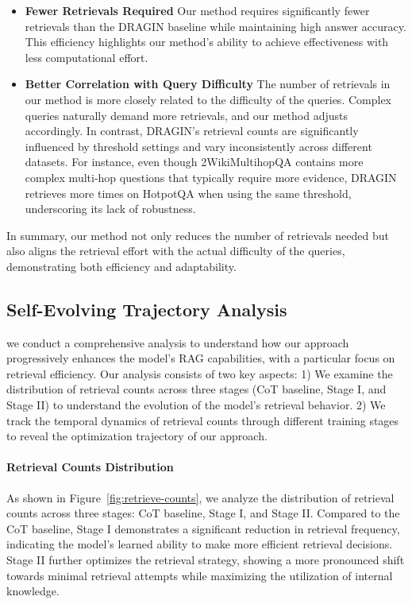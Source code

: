 \begin{itemize}
    \item \textbf{Fewer Retrievals Required} Our method requires significantly fewer retrievals than the DRAGIN baseline while maintaining high answer accuracy. This efficiency highlights our method's ability to achieve effectiveness with less computational effort.
    \item \textbf{Better Correlation with Query Difficulty} The number of retrievals in our method is more closely related to the difficulty of the queries. Complex queries naturally demand more retrievals, and our method adjusts accordingly. In contrast, DRAGIN's retrieval counts are significantly influenced by threshold settings and vary inconsistently across different datasets. For instance, even though 2WikiMultihopQA contains more complex multi-hop questions that typically require more evidence, DRAGIN retrieves more times on HotpotQA when using the same threshold, underscoring its lack of robustness.
\end{itemize}

In summary, our method not only reduces the number of retrievals needed but also aligns the retrieval effort with the actual difficulty of the queries, demonstrating both efficiency and adaptability.


\subsection{Self-Evolving Trajectory Analysis}

we conduct a comprehensive analysis to understand how our approach progressively enhances the model's RAG capabilities, with a particular focus on retrieval efficiency. Our analysis consists of two key aspects: 1) We examine the distribution of retrieval counts across three stages (CoT baseline, Stage I, and Stage II) to understand the evolution of the model's retrieval behavior. 2) We track the temporal dynamics of retrieval counts through different training stages to reveal the optimization trajectory of our approach.

\paragraph{Retrieval Counts Distribution} As shown in Figure~\ref{fig:retrieve-counts}, we analyze the distribution of retrieval counts across three stages: CoT baseline, Stage I, and Stage II. Compared to the CoT baseline, Stage I demonstrates a significant reduction in retrieval frequency, indicating the model's learned ability to make more efficient retrieval decisions. Stage II further optimizes the retrieval strategy, showing a more pronounced shift towards minimal retrieval attempts while maximizing the utilization of internal knowledge.

